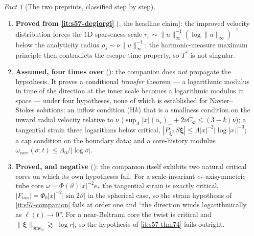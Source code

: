 \documentclass[11pt]{article}
\theoremstyle{definition}
\theoremstyle{remark}
\newtheorem{fact}[theorem]{Fact}
\begin{document}
\begin{fact}[The two preprints, classified step by step]
\begin{enumerate}[label=\textup{(\alph*)},leftmargin=2.4em]
    argument upgrades the distribution function to
    $|\{\omega>\lambda\}|\leq C_\omega\lambda^{-3/2}(\log\lambda)^{-3/2}$ and,
    by O'Neil's convolution lemma, $|\{|u|>\lambda\}|\leq
    C_u\lambda^{-3}(\log\lambda)^{-3}$.
  \item\label{it:s57-thm74} \textbf{Proved from \ref{it:s57-degiorgi}}
    (\cite[Thm.~7.4]{Grujic2026Log}, the headline claim): the improved
    velocity distribution forces the $1$D sparseness scale
    $r_s\sim\|u\|_\infty^{-1}(\log\|u\|_\infty)^{-1}$ below the analyticity
    radius $\rho_s\sim\nu\|u\|_\infty^{-1}$; the harmonic-measure maximum
    principle then contradicts the escape-time property, so $T^*$ is not
    singular.
  \item\label{it:s57-companion} \textbf{Assumed, four times over}
    (\cite[Thm.~5.7, Cor.~5.8, Def.~7.7, Thm.~7.9]{Grujic2026Decay}): the
    companion does \emph{not} propagate the hypothesis. It proves a
    conditional \emph{transfer} theorem --- a logarithmic modulus in time of
    the direction at the inner scale becomes a logarithmic modulus in space
    --- under four hypotheses, none of which is established for
    Navier--Stokes solutions: an inflow condition (H$k$) that is a
    smallness condition on the inward radial velocity relative to $\nu$
    ($\sup_A|x|(u_r)_-+2\nu C_\Phi\leq(3-k)\nu$); a tangential strain
    three logarithms below critical,
    $|P_{\boldsymbol\xi^\perp}S\boldsymbol\xi|\leq
    \Lambda|x|^{-2}|\log|x||^{-3}$; a cap condition on the boundary data; and
    a core-history modulus $\omega_{core}(\sigma;t)\leq\Lambda_0/|\log\sigma|$.
  \item\label{it:s57-obstructions} \textbf{Proved, and negative}
    (\cite[Prop.~7.10, Rem.~7.11, Prop.~7.12, Rem.~7.13]{Grujic2026Decay}):
    the companion itself exhibits two natural critical cores on which its own
    hypotheses fail. For a scale-invariant $e_*$-axisymmetric tube core
    $\omega=\Phi(\vartheta)|x|^{-2}e_*$ the tangential strain is exactly
    critical, $|F_{tan}|=\Phi_0|x|^{-2}|\sin2\vartheta|$ in the spherical
    case, so the strain hypothesis of \ref{it:s57-companion} fails at order
    one and ``the direction winds logarithmically as $\ell(t)\to0$''. For a
    near-Beltrami core the twist is critical and
    $\|\boldsymbol\xi\|_{\mathrm{bmo}_\phi}\gtrsim|\log r|$, so the
    hypothesis of \ref{it:s57-thm74} fails outright.
  \end{enumerate}
\end{fact}
\end{document}
